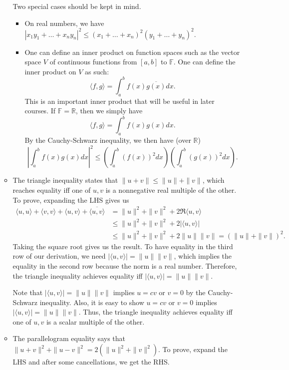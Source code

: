 \documentclass{article}
\newcommand{\R}{\mathbb{R}}
\newcommand{\F}{\mathbb{F}}
\newcommand{\conj}[1]{\overline{#1}}
\newcommand{\inp}[2]{\langle #1, #2 \rangle}
\newcommand{\nm}[1]{\| #1 \|}
\begin{document}
\begin{itemize}
\begin{itemize}
        Two special cases should be kept in mind.
        \begin{itemize}
            \item On real numbers, we have $|x_1y_1+\dots+x_ny_n|^2 \leq (x_1+\dots+x_n)^2(y_1+\dots+y_n)^2$.
            \item One can define an inner product on function spaces such as the vector space $V$ of continuous functions from $[a,b]$ to $\F$. One can define the inner product on $V$ as such: $$\inp{f}{g} = \int_a^b f(x)\conj{g(x)} dx.$$ This is an important inner product that will be useful in later courses. If $\F = \R$, then we simply have $$\inp{f}{g} = \int_a^b f(x)g(x) dx.$$ By the Cauchy-Schwarz inequality, we then have (over $\R$) $$\left|\int_a^b f(x)g(x)dx\right|^2 \leq \left(\int_a^b (f(x))^2 dx \right) \left(\int_a^b (g(x))^2 dx \right).$$
        \end{itemize}
        \item The triangle inequality states that $\|u+v\| \leq \|u\|+\|v\|$, which reaches equality iff one of $u,v$ is a nonnegative real multiple of the other.
        To prove, expanding the LHS gives us
        \begin{align*}
            \inp{u}{u}+\inp{v}{v}+\inp{u}{v}+\conj{\inp{u}{v}} & = \nm{u}^2+\nm{v}^2+2 \Re{\inp{u}{v}} \\ & \leq \nm{u}^2+\nm{v}^2+2|\inp{u}{v}| \\ & \leq \nm{u}^2+\nm{v}^2+2\nm{u}\nm{v} = (\nm{u}+\nm{v})^2.
        \end{align*}
        Taking the square root gives us the result. To have equality in the third row of our derivation, we need $|\inp{u}{v}| = \nm{u}\nm{v}$, which implies the equality in the second row because the norm is a real number. Therefore, the triangle inequality achieves equality iff $|\inp{u}{v}| = \nm{u}\nm{v}$.
        
        Note that $|\inp{u}{v}| = \nm{u}\nm{v}$ implies $u=cv$ or $v=0$ by the Cauchy-Schwarz inequality. Also, it is easy to show $u=cv$ or $v=0$ implies $|\inp{u}{v}| = \nm{u}\nm{v}$. Thus, the triangle inequality achieves equality iff one of $u,v$ is a scalar multiple of the other.
        \item The parallelogram equality says that $\|u+v\|^2+\|u-v\|^2 = 2(\|u\|^2+ \|v\|^2)$. To prove, expand the LHS and after some cancellations, we get the RHS.
    \end{itemize}
\end{itemize}
\end{document}
